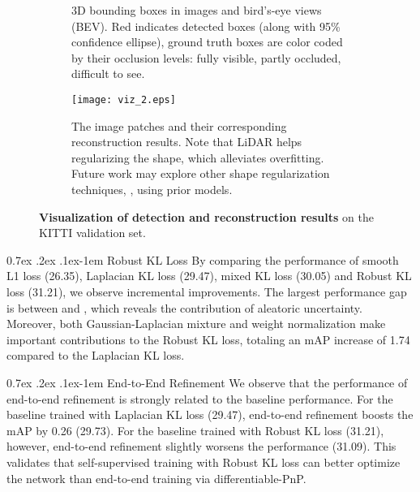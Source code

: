 \documentclass[10pt,twocolumn,letterpaper]{article}
\makeatletter
\renewcommand{\paragraph}{
  \@startsection{paragraph}{4}
  {\z@}{0.7ex \@plus .2ex \@minus .1ex}{-1em}
  {\normalfont\normalsize\bfseries}
}
\makeatother
\begin{document}
\begin{figure*}[t]
  \begin{subfigure}{0.58\textwidth}
    \begin{center}
    
    \end{center}
    \vspace*{-4.3mm}
    \caption{3D bounding boxes in images and bird's-eye views (BEV). \textcolor{box_red}{Red} indicates detected boxes (along with 95\% confidence ellipse), ground truth boxes are color coded by their occlusion levels: \textcolor{box_green}{fully visible}, \textcolor{box_cyan}{partly occluded}, \textcolor{box_blue}{difficult to see}.} \label{fig:viz_a}
  \end{subfigure}\hspace*{\fill}
  \begin{subfigure}{0.39\textwidth}
    \begin{center}
    \texttt{[image: viz\_2.eps]}
    \end{center}
    \vspace*{-5.3mm}
    \caption{The image patches and their corresponding reconstruction results. Note that LiDAR helps regularizing the shape, which alleviates overfitting. Future work may explore other shape regularization techniques, \eg, using prior models.} \label{fig:viz_b}
  \end{subfigure}\vspace*{1mm}
  \caption{\textbf{Visualization of detection and reconstruction results} on the KITTI validation set.} 
\label{fig:viz}
\end{figure*}

\paragraph{Robust KL Loss} By comparing the performance of smooth L1 loss (26.35), Laplacian KL loss (29.47), mixed KL loss (30.05) and Robust KL loss (31.21), we observe incremental improvements. The largest performance gap is between  and , which reveals the contribution of aleatoric uncertainty. Moreover, both Gaussian-Laplacian mixture and weight normalization make important contributions to the Robust KL loss, totaling an mAP increase of 1.74 compared to the Laplacian KL loss.

\paragraph{End-to-End Refinement} We observe that the performance of end-to-end refinement is strongly related to the baseline performance. For the baseline trained with Laplacian KL loss (29.47), end-to-end refinement boosts the mAP by 0.26 (29.73). For the baseline trained with Robust KL loss (31.21), however, end-to-end refinement slightly worsens the performance (31.09). This validates that self-supervised training with Robust KL loss can better optimize the network than end-to-end training via differentiable-PnP.
\end{document}
